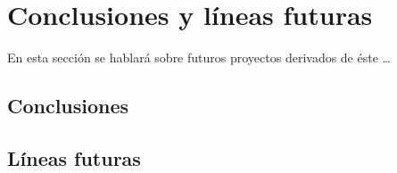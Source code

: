 
\chapter{Conclusiones y líneas futuras}
\label{cha:concl-lineas-futuras}

En esta sección se hablará sobre futuros proyectos derivados de éste \ldots

\section{Conclusiones}
\label{sec:conclusiones-finales}

\section{Líneas futuras}
\label{sec:lineas-futuras}